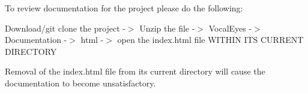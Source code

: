 To review documentation for the project please do the following\+:

Download/git clone the project -\/$>$ Unzip the file -\/$>$ Vocal\+Eyes -\/$>$ Documentation -\/$>$ html -\/$>$ open the index.\+html file WITHIN ITS CURRENT DIRECTORY

Removal of the index.\+html file from its current directory will cause the documentation to become unsatisfactory. 